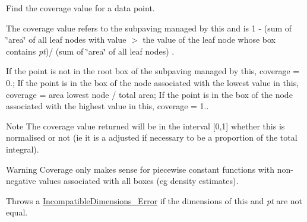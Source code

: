 \-Find the coverage value for a data point. 

\-The coverage value refers to the subpaving managed by this and is 1 -\/ (sum of \char`\"{}area\char`\"{} of all leaf nodes with value $>$ the value of the leaf node whose box contains {\itshape pt\/})/ (sum of \char`\"{}area\char`\"{} of all leaf nodes) .

\-If the point is not in the root box of the subpaving managed by this, coverage = 0.; \-If the point is in the box of the node associated with the lowest value in this, coverage = area lowest node / total area; \-If the point is in the box of the node associated with the highest value in this, coverage = 1..

\begin{DoxyNote}{\-Note}
\-The coverage value returned will be in the interval \mbox{[}0,1\mbox{]} whether this is normalised or not (ie it is a adjusted if necessary to be a proportion of the total integral).
\end{DoxyNote}
\begin{DoxyWarning}{\-Warning}
\-Coverage only makes sense for piecewise constant functions with non-\/negative values associated with all boxes (eg density estimates).
\end{DoxyWarning}
\-Throws a \hyperlink{classsubpavings_1_1IncompatibleDimensions__Error}{\-Incompatible\-Dimensions\-\_\-\-Error} if the dimensions of this and {\itshape pt\/} are not equal.


